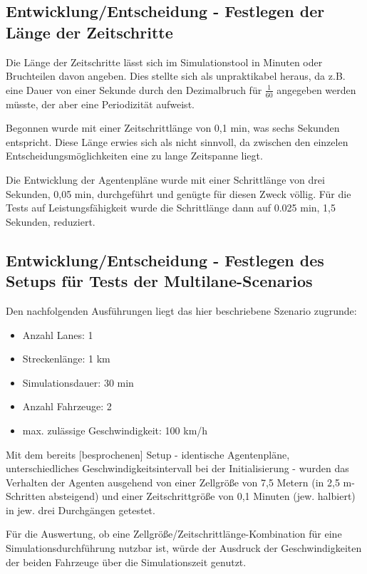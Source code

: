 \subsection{Entwicklung/Entscheidung - Festlegen der Länge der Zeitschritte}

Die Länge der Zeitschritte lässt sich im Simulationstool in Minuten oder Bruchteilen davon angeben. Dies stellte sich als unpraktikabel heraus, da z.B. eine Dauer von einer Sekunde durch den Dezimalbruch für $\frac{1}{60}$ angegeben werden müsste, der aber eine Periodizität aufweist.

Begonnen wurde mit einer Zeitschrittlänge von 0,1 min, was sechs Sekunden entspricht. 
Diese Länge erwies sich als nicht sinnvoll, da zwischen den einzelen Entscheidungsmöglichkeiten eine zu lange Zeitspanne liegt.

Die Entwicklung der Agentenpläne wurde mit einer Schrittlänge von  drei Sekunden, 0,05 min, durchgeführt und genügte für diesen Zweck völlig.
Für die Tests auf Leistungsfähigkeit wurde die Schrittlänge dann auf 0.025 min, 1,5 Sekunden, reduziert.



\subsection{Entwicklung/Entscheidung - Festlegen des Setups für Tests der Multilane-Scenarios}

Den nachfolgenden Ausführungen liegt das hier beschriebene Szenario zugrunde:
\begin{itemize}
	\item Anzahl Lanes: 1
	\item Streckenlänge: 1 km
	\item Simulationsdauer: 30 min
	\item Anzahl Fahrzeuge: 2
	\item max. zulässige Geschwindigkeit: 100 km/h
\end{itemize}
Mit dem bereits [besprochenen] Setup - identische Agentenpläne, unterschiedliches Geschwindigkeitsintervall bei der Initialisierung - wurden das Verhalten der Agenten ausgehend von einer Zellgröße von 7,5 Metern (in 2,5 m-Schritten absteigend) und einer Zeitschrittgröße von 0,1 Minuten (jew. halbiert) in jew. drei Durchgängen getestet.

Für die Auswertung, ob eine Zellgröße/Zeitschrittlänge-Kombination für eine Simulationsdurchführung nutzbar ist, würde der Ausdruck der Geschwindigkeiten der beiden Fahrzeuge über die Simulationszeit genutzt.

